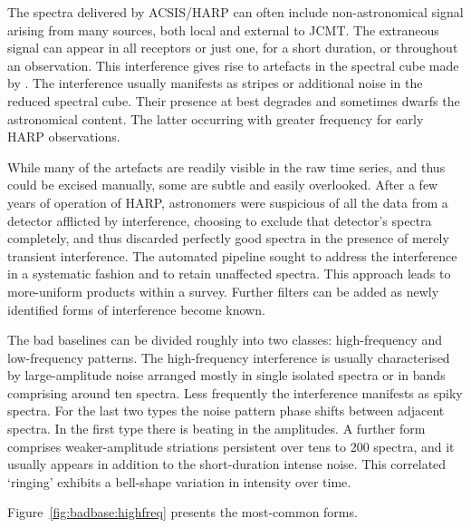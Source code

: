 \documentclass[final,authoryear,5p,times,twocolumn]{elsarticle}
\begin{document}
The spectra delivered by ACSIS/HARP can often include non-astronomical
signal arising from many sources, both local and external to JCMT. The
extraneous signal can appear in all receptors or just one, for a short
duration, or throughout an observation.  This interference gives rise
to artefacts in the spectral cube made by \makecube.  The interference
usually manifests as stripes or additional noise in the reduced
spectral cube.  Their presence at best degrades and sometimes dwarfs
the astronomical content.  The latter occurring with greater frequency
for early HARP observations.

While many of the artefacts are readily visible in the raw time
series, and thus could be excised manually, some are subtle and easily
overlooked.  After a few years of operation of HARP, astronomers were
suspicious of all the data from a detector afflicted by interference,
choosing to exclude that detector's spectra completely, and thus
discarded perfectly good spectra in the presence of merely transient
interference.  The automated pipeline sought to address the
interference in a systematic fashion and to retain unaffected spectra.
This approach leads to more-uniform products within a survey.  Further
filters can be added as newly identified forms of interference become
known.

The bad baselines can be divided roughly into two classes:
high-frequency and low-frequency patterns.  The high-frequency
interference is usually characterised by large-amplitude noise
arranged mostly in single isolated spectra or in bands comprising
around ten spectra.  Less frequently the interference manifests as
spiky spectra.  For the last two types the noise pattern phase shifts
between adjacent spectra.  In the first type there is beating in the
amplitudes.  A further form comprises weaker-amplitude striations
persistent over tens to 200 spectra, and it usually appears in
addition to the short-duration intense noise.  This correlated
`ringing' exhibits a bell-shape variation in intensity over time.

Figure~\ref{fig:badbase:highfreq} presents the most-common forms.
\end{document}
